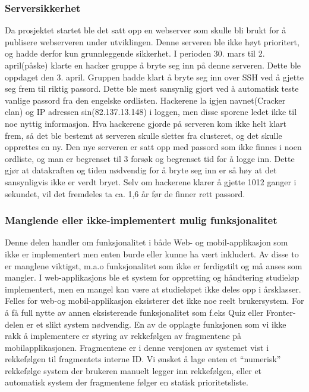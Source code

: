 \documentclass[../main.tex]{subfiles}
\begin{document}
\subsubsection{Serversikkerhet}

Da prosjektet startet ble det satt opp en webserver som skulle bli brukt for å publisere webserveren under utviklingen. Denne serveren ble ikke høyt prioritert, og hadde derfor kun grunnleggende sikkerhet. \newline
I perioden 30. mars til 2. april(påske) klarte en hacker gruppe å bryte seg inn på denne serveren. Dette ble oppdaget den 3. april. Gruppen hadde klart å bryte seg inn over SSH ved å gjette seg frem til riktig passord. Dette ble mest sansynlig gjort ved å automatisk teste vanlige passord fra den engelske ordlisten. Hackerene la igjen navnet(Cracker clan) og IP adressen sin(82.137.13.148) i loggen, men disse sporene ledet ikke til noe nyttig informasjon. \newline
Hva hackerene gjorde på serveren kom ikke helt klart frem, så det ble bestemt at serveren skulle slettes fra clusteret, og det skulle opprettes en ny. \newline
Den nye serveren er satt opp med passord som ikke finnes i noen ordliste, og man er begrenset til 3 forsøk og begrenset tid for å logge inn. Dette gjør at datakraften og tiden nødvendig for å bryte seg inn er så høy at det sansynligvis ikke er verdt bryet. Selv om hackerene klarer å gjette 1012 ganger i sekundet, vil det fremdeles ta ca. 1,6 år før de finner rett passord.

\subsubsection{Manglende eller ikke-implementert mulig funksjonalitet}

Denne delen handler om funksjonalitet i både Web- og mobil-applikasjon som ikke er implementert men enten burde eller kunne ha vært inkludert. Av disse to er manglene viktigst, m.a.o funksjonalitet som ikke er ferdigstilt og må anses som mangler. \newline
\newline
I web-applikasjons ble et system for oppretting og håndtering studieløp implementert, men en mangel kan være at studieløpet ikke deles opp i årsklasser. \newline
\newline
Felles for web-og mobil-applikasjon eksisterer det ikke noe reelt brukersystem. For å få full nytte av annen eksisterende funksjonalitet som f.eks Quiz eller Fronter-delen er et slikt system nødvendig.\newline
\newline
En av de opplagte funksjonen som vi ikke rakk å implementere er styring av rekkefølgen av fragmentene på mobilapplikasjonen. Fragmentene er i denne versjonen av systemet vist i rekkefølgen til fragmentets interne ID. Vi ønsket å lage enten et “numerisk” rekkefølge system der brukeren manuelt legger inn rekkefølgen, eller et automatisk system der fragmentene følger en statisk prioritetsliste. 
\end{document}
